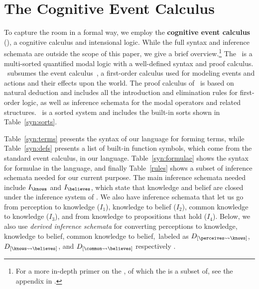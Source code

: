 \section{The Cognitive Event Calculus}

To capture the room in a formal way, we employ the
\textbf{cognitive event calculus} (\CEC), a cognitive calculus and
intensional logic.  While the full syntax
and inference schemata are outside the scope of this paper, we give a
brief overview.\footnote{For a more in-depth primer on the \DCEC, of which the \CEC is a subset of,
see the appendix in \cite{nsg_sb_dde_ijcai}.} The \CEC\ is a multi-sorted
quantified modal logic with a well-defined syntax and proof calculus.
\CEC\ subsumes the event calculus~\cite{mueller_commonsense_2014}, a first-order
calculus used for modeling events and actions and their effects upon
the world.  The proof calculus of \CEC\ is based on natural deduction
\cite{gentzen_investigations_1964} and includes all the introduction and elimination
rules for first-order logic, as well as inference schemata for the
modal operators and related structures.  \CEC\ is a sorted system and
includes the built-in sorts shown in Table~\ref{syn:sorts}.

Table~\ref{syn:terms} presents the syntax of our language for forming
terms, while Table~\ref{syn:defs} presents a list of built-in function
symbols, which come from the standard event calculus, in our language.
Table~\ref{syn:formulae} shows the syntax for
formulae in the language, and finally Table~\ref{rules} shows a subset of
inference schemata needed for our current purpose. The main
inference schemata needed include $I_{\knows}$ and $I_{\believes}$,
which state that knowledge and belief are closed under the inference
system of \CEC.  We also have inference schemata that let us go
from perception to knowledge ($I_1$), knowledge to belief ($I_2$),
common knowledge to knowledge ($I_3$), and from knowledge to
propositions that hold ($I_4$). Below, we also use \emph{derived
  inference schemata} for converting perceptions to knowledge,
knowledge to belief, common knowledge to belief,~labeled as
$D_{[\perceives \leadsto \knows]}$, $D_{[\knows \leadsto \believes]}$,
and $D_{[\common \leadsto \believes]}$ respectively
\cite{ArkoudasAndBringsjord2008Pricai}.


